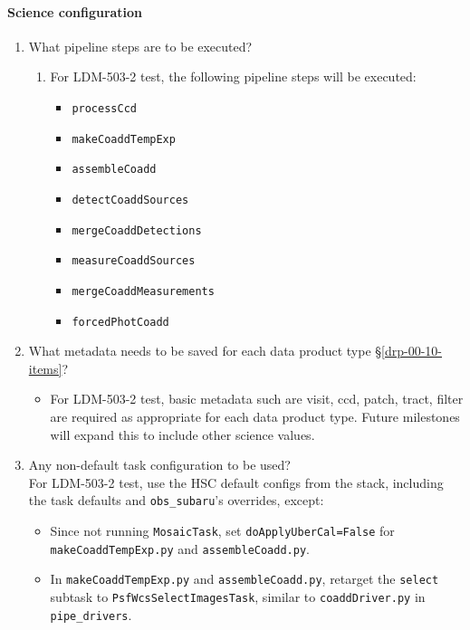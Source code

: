 \paragraph{Science configuration}
\begin{enumerate}
    \item{What pipeline steps are to be executed?}
    \begin{enumerate}
        \item{For LDM-503-2 test, the following pipeline steps will be executed: }
        \begin{itemize}
        \item{\texttt{processCcd}}
        \item{\texttt{makeCoaddTempExp}}
        \item{\texttt{assembleCoadd}}
        \item{\texttt{detectCoaddSources}}
        \item{\texttt{mergeCoaddDetections}}
        \item{\texttt{measureCoaddSources}}
        \item{\texttt{mergeCoaddMeasurements}}
        \item{\texttt{forcedPhotCoadd}}
        \end{itemize}
    \end{enumerate}
    \item{What metadata needs to be saved for each data product type \S\ref{drp-00-10-items}?}
    \begin{itemize}
        \item{For LDM-503-2 test, basic metadata such are visit, ccd, patch, tract, filter are required as appropriate for each data product type.   Future milestones will expand this to include other science values.}
    \end{itemize}
    \item{Any non-default task configuration to be used?} \\
        For LDM-503-2 test, use the HSC default configs from the stack, 
        including the task defaults and \texttt{obs{\_}subaru}’s overrides, except:
        \begin{itemize}
            \item{Since not running \texttt{MosaicTask}, set \texttt{doApplyUberCal=False} for \texttt{makeCoaddTempExp.py} and \texttt{assembleCoadd.py}.}
            \item{In \texttt{makeCoaddTempExp.py} and \texttt{assembleCoadd.py}, retarget the \texttt{select} subtask to \texttt{PsfWcsSelectImagesTask}, similar to \texttt{coaddDriver.py} in \texttt{pipe{\_}drivers}.}
        \end{itemize}
\end{enumerate}
